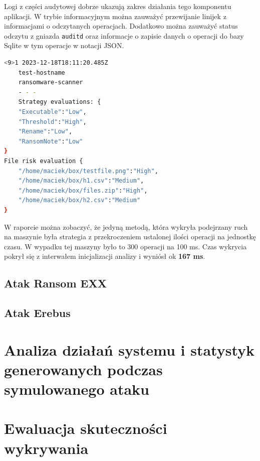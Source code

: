Logi z części audytowej dobrze ukazują zakres działania tego komponentu aplikacji. W trybie informacyjnym można zauważyć przewijanie linijek z informacjami o odczytanych operacjach. Dodatkowo można zauważyć status odczytu z gniazda \texttt{auditd} oraz informacje o zapisie danych o operacji do bazy Sqlite w tym operacje w notacji JSON.

\begin{lstlisting}[language=bash,
    backgroundcolor=\color{EEGold!5!white},
    caption={Raport wygenerowany ze skanera, który pozwoliłem sobie delikatnie sformatować aby widać było lepiej jego treść.},
    label={lst:raportau}]
    <9>1 2023-12-18T18:11:20.485Z
    test-hostname 
    ransomware-scanner 
    - - -  
    Strategy evaluations: {
    "Executable":"Low",
    "Threshold":"High",
    "Rename":"Low",
    "RansomNote":"Low"
}
File risk evaluation {
    "/home/maciek/box/testfile.png":"High",
    "/home/maciek/box/h1.csv":"Medium",
    "/home/maciek/box/files.zip":"High",
    "/home/maciek/box/h2.csv":"Medium"
}
\end{lstlisting}
W raporcie można zobaczyć, że jedyną metodą, która wykryła podejrzany ruch na maszynie była strategia z przekroczeniem ustalonej ilości operacji na jednostkę czasu. W wypadku tej maszyny było to 300 operacji na 100 ms. Czas wykrycia pokrył się z interwałem inicjalizacji analizy i wyniósł ok \textbf{167 ms}.
\subsection{Atak Ransom EXX}
\subsection{Atak Erebus}
\section{Analiza działań systemu i statystyk generowanych podczas symulowanego ataku}
\section{Ewaluacja skuteczności wykrywania}
